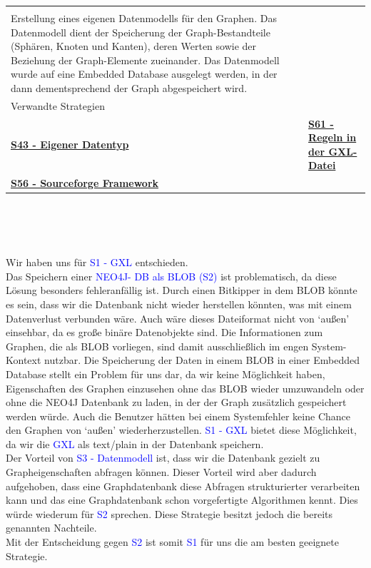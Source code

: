 \documentclass[enabledeprecatedfontcommands,fontsize=11pt,paper=a4,twoside]{scrartcl}
\newcounter{one}
\newcommand{\cb}[1]{{\textcolor{blue}{#1}}}
\begin{document}
\begin{tabular} {|p{8cm} p{8cm}|}
{{			\textbf{S3 - Datenmodell}: \\
			Erstellung eines eigenen Datenmodells für den Graphen. Das Datenmodell dient der Speicherung der Graph-Bestandteile (Sphären, Knoten und Kanten), deren Werten sowie der Beziehung der Graph-Elemente zueinander. Das Datenmodell wurde auf eine Embedded Database ausgelegt werden, in der dann dementsprechend der Graph abgespeichert wird.
	} }\\ [11ex] \hline
	\multicolumn{2}{|l|}{Verwandte Strategien} \\
	\textbf{\hyperlink {ooo}{S43 - Eigener Datentyp}}&
	\textbf{\hyperlink {vvv}{S61 - Regeln in der GXL-Datei}} \\
	\textbf{\hyperlink {ttt}{S56 - Sourceforge Framework}}&
	\\\hline
\end{tabular}\\ \\ \\
\begin{onehalfspace}
	Wir haben uns für \cb{S1 - GXL} entschieden. \\ 
	Das Speichern einer \cb{NEO4J- DB als BLOB (S2)} ist problematisch, da diese Lösung besonders fehleranfällig ist. Durch einen Bitkipper in dem BLOB könnte es sein, dass wir die Datenbank nicht wieder herstellen könnten, was mit einem Datenverlust verbunden wäre. Auch wäre dieses Dateiformat nicht von ‘außen’ einsehbar, da es große binäre Datenobjekte sind. Die Informationen zum Graphen, die als BLOB vorliegen, sind damit ausschließlich im engen System-Kontext nutzbar. Die Speicherung der Daten in einem BLOB in einer Embedded Database stellt ein Problem für uns dar, da wir keine Möglichkeit haben, Eigenschaften des Graphen einzusehen ohne das BLOB wieder umzuwandeln oder ohne die NEO4J Datenbank zu laden, in der der Graph zusätzlich gespeichert werden würde. Auch die Benutzer hätten bei einem Systemfehler keine Chance den Graphen von ‘außen’ wiederherzustellen. \cb{S1 - GXL} bietet diese Möglichkeit, da wir die \cb{GXL} als text/plain in der Datenbank speichern. \\ 
	Der Vorteil von \cb{S3 - Datenmodell} ist, dass wir die Datenbank gezielt zu Grapheigenschaften abfragen können. Dieser Vorteil wird aber dadurch aufgehoben, dass eine Graphdatenbank diese Abfragen strukturierter verarbeiten kann und das eine Graphdatenbank schon vorgefertigte Algorithmen kennt. Dies würde wiederum für \cb{S2} sprechen. Diese Strategie besitzt jedoch die bereits genannten Nachteile. \\
	Mit der Entscheidung gegen \cb{S2} ist somit \cb{S1} für uns die am besten geeignete Strategie.
\end{onehalfspace}
\end{document}
